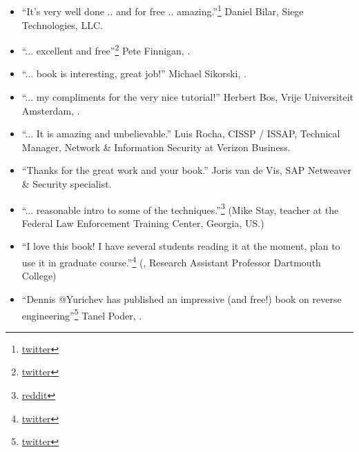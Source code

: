 \subsection*{ \IT{\TITLE}}

\begin{itemize}
\item ``It's very well done .. and for free .. amazing.''\footnote{\href{http://go.yurichev.com/17095}{twitter}} Daniel Bilar, Siege Technologies, LLC.

\item ``... excellent and free''\footnote{\href{http://go.yurichev.com/17096}{twitter}} Pete Finnigan, \oracle{}.

\item ``... book is interesting, great job!'' Michael Sikorski,  .

\item ``... my compliments for the very nice tutorial!'' Herbert Bos,  Vrije Universiteit Amsterdam,  .

\item ``... It is amazing and unbelievable.'' Luis Rocha, CISSP / ISSAP, Technical Manager, Network \& Information Security at Verizon Business.

\item ``Thanks for the great work and your book.'' Joris van de Vis, SAP Netweaver \& Security specialist.

\item ``... reasonable intro to some of the techniques.''\footnote{\href{http://go.yurichev.com/17099}{reddit}} (Mike Stay, teacher at the Federal Law Enforcement Training Center, Georgia, US.)

\item ``I love this book! I have several students reading it at the moment, plan to use it in graduate course.''\footnote{\href{http://go.yurichev.com/17097}{twitter}} (, Research Assistant Professor   Dartmouth College)

\item ``Dennis @Yurichev has published an impressive (and free!) book on reverse engineering''\footnote{\href{http://go.yurichev.com/17098}{twitter}} Tanel Poder, .

\end{itemize}
